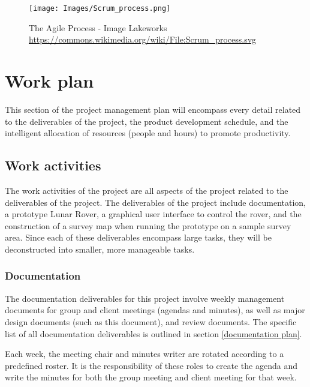 \documentclass{article}
\newcounter{subsubsubsection}[subsubsection]
\begin{document}
\begin{figure}[t]
    \centering
    \texttt{[image: Images/Scrum\_process.png]}
    \caption{The Agile Process - Image \textcopyright \space
Lakeworks \url{https://commons.wikimedia.org/wiki/File:Scrum_process.svg} \label{fig:agile process}}
\end{figure}



\section{Work plan}
This section of the project management plan will encompass every detail related to the deliverables of the project, the product development schedule, and the intelligent allocation of resources (people and hours) to promote productivity.
\subsection{Work activities}
\begin{adjustwidth}{1em}{0pt}
The work activities of the project are all aspects of the project related to the deliverables of the project. The deliverables of the project include documentation, a prototype Lunar Rover, a graphical user interface to control the rover, and the construction of a survey map when running the prototype on a sample survey area. Since each of these deliverables encompass large tasks, they will be deconstructed into smaller, more manageable tasks. 
\end{adjustwidth}

\subsubsection{Documentation}
\begin{adjustwidth}{2em}{0pt}
The documentation deliverables for this project involve weekly management documents for group and client meetings (agendas and minutes), as well as major design documents (such as this document), and review documents. The specific list of all documentation deliverables is outlined in section \ref{documentation plan}.
\end{adjustwidth}

\begin{adjustwidth}{3em}{0pt}
Each week, the meeting chair and minutes writer are rotated according to a predefined roster. It is the responsibility of these roles to create the agenda and write the minutes for both the group meeting and client meeting for that week.
\end{adjustwidth}
\end{document}

